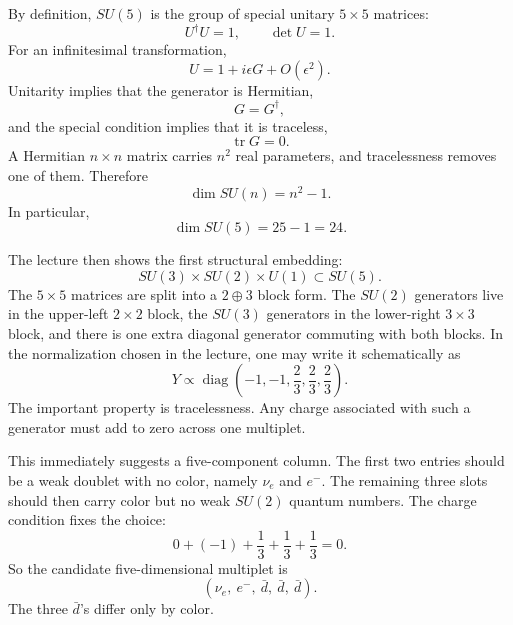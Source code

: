 By definition, \(SU(5)\) is the group of special unitary \(5\times 5\) matrices:
\begin{equation}
U^\dagger U=1,
\qquad
\det U=1.
\end{equation}
For an infinitesimal transformation,
\begin{equation}
U=1+i\epsilon G+O(\epsilon^2).
\end{equation}
Unitarity implies that the generator is Hermitian,
\begin{equation}
G=G^\dagger,
\end{equation}
and the special condition implies that it is traceless,
\begin{equation}
\operatorname{tr}G=0.
\end{equation}
A Hermitian \(n\times n\) matrix carries \(n^2\) real parameters, and tracelessness removes one of them. Therefore
\begin{equation}
\dim SU(n)=n^2-1.
\end{equation}
In particular,
\begin{equation}
\dim SU(5)=25-1=24.
\end{equation}

The lecture then shows the first structural embedding:
\begin{equation}
SU(3)\times SU(2)\times U(1)\subset SU(5).
\end{equation}
The \(5\times 5\) matrices are split into a \(2\oplus 3\) block form. The \(SU(2)\) generators live in the upper-left \(2\times 2\) block, the \(SU(3)\) generators in the lower-right \(3\times 3\) block, and there is one extra diagonal generator commuting with both blocks. In the normalization chosen in the lecture, one may write it schematically as
\begin{equation}
Y\propto
\operatorname{diag}
\left(
-1,-1,\frac{2}{3},\frac{2}{3},\frac{2}{3}
\right).
\end{equation}
The important property is tracelessness. Any charge associated with such a generator must add to zero across one multiplet.

This immediately suggests a five-component column. The first two entries should be a weak doublet with no color, namely \(\nu_e\) and \(e^-\). The remaining three slots should then carry color but no weak \(SU(2)\) quantum numbers. The charge condition fixes the choice:
\begin{equation}
0+(-1)+\frac{1}{3}+\frac{1}{3}+\frac{1}{3}=0.
\end{equation}
So the candidate five-dimensional multiplet is
\begin{equation}
(\nu_e,\ e^-,\ \bar d,\ \bar d,\ \bar d).
\end{equation}
The three \(\bar d\)'s differ only by color.

